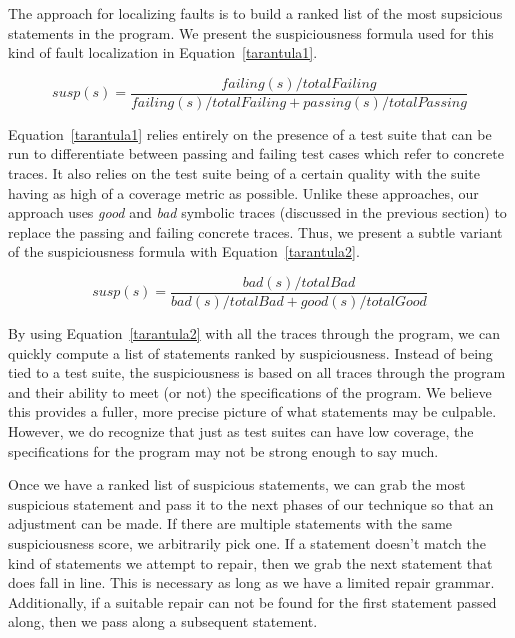 \documentclass[]{article}
\begin{document}
The approach for localizing faults is to build a ranked list of the most
supsicious statements in the program. We present the suspiciousness formula
used for this kind of fault localization in Equation~\ref{tarantula1}.

\begin{equation}
\label{tarantula1}
    susp(s) = \frac{failing(s)/totalFailing}{failing(s)/totalFailing + passing(s)/totalPassing}
\end{equation}

Equation~\ref{tarantula1} relies entirely on the presence of a test suite
that can be run to differentiate between passing and failing test cases
which refer to concrete traces. It also relies on the test suite being of a
certain quality with the suite having as high of a coverage metric as
possible. Unlike these approaches, our approach uses \emph{good} and
\emph{bad} symbolic traces (discussed in the previous section) to replace
the passing and failing concrete traces. Thus, we present a subtle variant
of the suspiciousness formula with Equation~\ref{tarantula2}.

\begin{equation}
\label{tarantula2}
    susp(s) = \frac{bad(s)/totalBad}{bad(s)/totalBad + good(s)/totalGood}
\end{equation}

By using Equation~\ref{tarantula2} with all the traces through the program, we can
quickly compute a list of statements ranked by suspiciousness. Instead of
being tied to a test suite, the suspiciousness is based on all traces
through the program and their ability to meet (or not) the specifications of
the program. We believe this provides a fuller, more precise picture of what
statements may be culpable. However, we do recognize that just as test
suites can have low coverage, the specifications for the program may not be
strong enough to say much.

Once we have a ranked list of suspicious statements, we can grab the most
suspicious statement and pass it to the next phases of our technique so that
an adjustment can be made. If there are multiple statements with the same
suspiciousness score, we arbitrarily pick one. If a statement doesn't match
the kind of statements we attempt to repair, then we grab the next statement
that does fall in line. This is necessary as long as we have a limited
repair grammar. Additionally, if a suitable repair can not be found for the
first statement passed along, then we pass along a subsequent statement.
\end{document}
